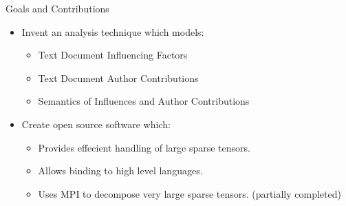 \documentclass[handout]{beamer}
\begin{document}
\begin{frame}{Goals and Contributions}
  \begin{itemize}[<+->]
  \item Invent an analysis technique which models:
    \begin{itemize}
    \item Text Document Influencing Factors
    \item Text Document Author Contributions
    \item Semantics of Influences and Author Contributions
    \end{itemize}
  \item Create open source software which:
    \begin{itemize}
    \item Provides effecient handling of large sparse tensors.
    \item Allows binding to high level languages.
    \item Uses MPI to decompose very large sparse tensors. (partially
      completed)
    \end{itemize}
  \end{itemize}
\end{frame}
\end{document}
